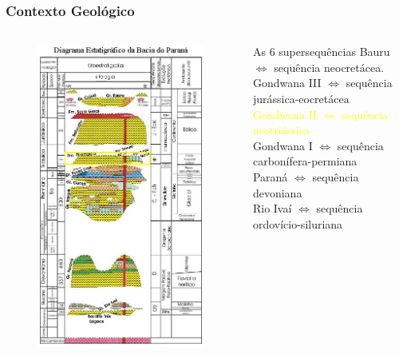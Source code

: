 \documentclass[aspectratio=10]{beamer} %
\begin{document}
\begin{frame}
\frametitle{Contexto Geológico}
\begin{columns}
\begin{column}{0.4\textwidth}
\begin{figure}
\includegraphics[scale=0.36]{Imagens/diagramagondwanaii.png}
\end{figure}
\end{column}
\begin{column}{0.75\textwidth}
\begin{block}{As $6$ supersequências}
Bauru $\Longleftrightarrow$  sequência neocretácea.\\
Gondwana III $\Longleftrightarrow$ sequência jurássica-eocretácea\\
\textcolor{yellow}{Gondwana II $\Longleftrightarrow$ sequência neotriássica} \\
Gondwana I $\Longleftrightarrow$ sequência carbonífera-permiana\\ 
Paraná $\Longleftrightarrow$ sequência devoniana\\
Rio Ivaí $\Longleftrightarrow$ sequência ordovício-siluriana\\
\cite{Vail_1977,assine_1994,milani_orogenias_1998}
\end{block}
\end{column}
\end{columns}
\end{frame}
\end{document}
